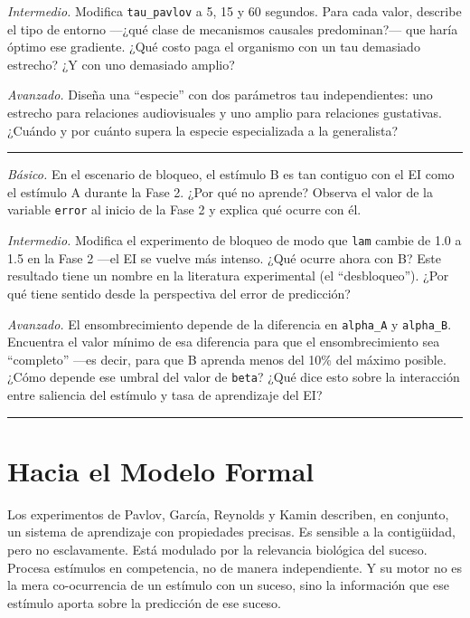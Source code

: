 \documentclass[
  letterpaper,
  DIV=11,
  numbers=noendperiod]{scrreprt}
\begin{document}
\begin{tcolorbox}[enhanced jigsaw, arc=.35mm, bottomrule=.15mm, breakable, colback=white, colframe=quarto-callout-note-color-frame, left=2mm, leftrule=.75mm, opacityback=0, rightrule=.15mm, toprule=.15mm]
\emph{Intermedio.} Modifica \texttt{tau\_pavlov} a 5, 15 y 60 segundos.
Para cada valor, describe el tipo de entorno ---¿qué clase de mecanismos
causales predominan?--- que haría óptimo ese gradiente. ¿Qué costo paga
el organismo con un tau demasiado estrecho? ¿Y con uno demasiado amplio?

\emph{Avanzado.} Diseña una ``especie'' con dos parámetros tau
independientes: uno estrecho para relaciones audiovisuales y uno amplio
para relaciones gustativas. ¿Cuándo y por cuánto supera la especie
especializada a la generalista?

\begin{center}\rule{0.5\linewidth}{0.5pt}\end{center}

\emph{Básico.} En el escenario de bloqueo, el estímulo B es tan contiguo
con el EI como el estímulo A durante la Fase 2. ¿Por qué no aprende?
Observa el valor de la variable \texttt{error} al inicio de la Fase 2 y
explica qué ocurre con él.

\emph{Intermedio.} Modifica el experimento de bloqueo de modo que
\texttt{lam} cambie de 1.0 a 1.5 en la Fase 2 ---el EI se vuelve más
intenso. ¿Qué ocurre ahora con B? Este resultado tiene un nombre en la
literatura experimental (el ``desbloqueo''). ¿Por qué tiene sentido
desde la perspectiva del error de predicción?

\emph{Avanzado.} El ensombrecimiento depende de la diferencia en
\texttt{alpha\_A} y \texttt{alpha\_B}. Encuentra el valor mínimo de esa
diferencia para que el ensombrecimiento sea ``completo'' ---es decir,
para que B aprenda menos del 10\% del máximo posible. ¿Cómo depende ese
umbral del valor de \texttt{beta}? ¿Qué dice esto sobre la interacción
entre saliencia del estímulo y tasa de aprendizaje del EI?

\begin{center}\rule{0.5\linewidth}{0.5pt}\end{center}

\section{Hacia el Modelo Formal}\label{hacia-el-modelo-formal}

Los experimentos de Pavlov, García, Reynolds y Kamin describen, en
conjunto, un sistema de aprendizaje con propiedades precisas. Es
sensible a la contigüidad, pero no esclavamente. Está modulado por la
relevancia biológica del suceso. Procesa estímulos en competencia, no de
manera independiente. Y su motor no es la mera co-ocurrencia de un
estímulo con un suceso, sino la información que ese estímulo aporta
sobre la predicción de ese suceso.


\end{tcolorbox}
\end{document}
